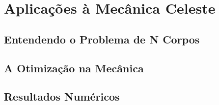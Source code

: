 

\chapter{\Large{Aplicações à Mecânica Celeste}} \label{chp:4}


\section{Entendendo o Problema de N Corpos}


\section{{A Otimização na Mecânica}}


\section{Resultados Numéricos}
